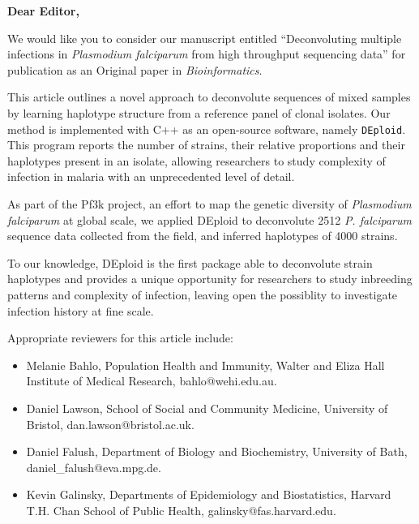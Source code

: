 \documentclass{letter}
\begin{document}

\begin{letter}{ } %


\opening{\textbf{Dear Editor,}}

We would like you to consider our manuscript entitled ``Deconvoluting multiple infections in {\it Plasmodium falciparum} from high throughput sequencing data'' for publication as an Original paper in {\em Bioinformatics}.

This article outlines a novel approach to deconvolute sequences of mixed samples by learning haplotype structure from a reference panel of clonal isolates. Our method is implemented with C++ as an open-source software, namely {\tt DEploid}. This program reports the number of strains, their relative proportions and their haplotypes present in an isolate, allowing researchers to study complexity of infection in malaria
with an unprecedented level of detail.

As part of the Pf3k project, an effort to map the genetic diversity of {\it Plasmodium falciparum} at global scale, we applied DEploid to deconvolute 2512 {\em P. falciparum} sequence data collected from the field, and inferred haplotypes of 4000 strains.

To our knowledge, DEploid is the first package able to deconvolute strain haplotypes and provides a unique opportunity for researchers to study inbreeding patterns and complexity of infection, leaving open the possiblity to investigate infection history at fine scale.

Appropriate reviewers for this article include:
\begin{itemize}
\item Melanie Bahlo, Population Health and Immunity, Walter and Eliza Hall Institute of Medical Research, bahlo@wehi.edu.au.
\item Daniel Lawson, School of Social and Community Medicine, University of Bristol, dan.lawson@bristol.ac.uk.
\item Daniel Falush, Department of Biology and Biochemistry, University of Bath, daniel\_falush@eva.mpg.de.
\item Kevin Galinsky, Departments of Epidemiology and Biostatistics, Harvard T.H. Chan School of Public Health, galinsky@fas.harvard.edu.
\end{itemize}



\end{letter}
\end{document}
